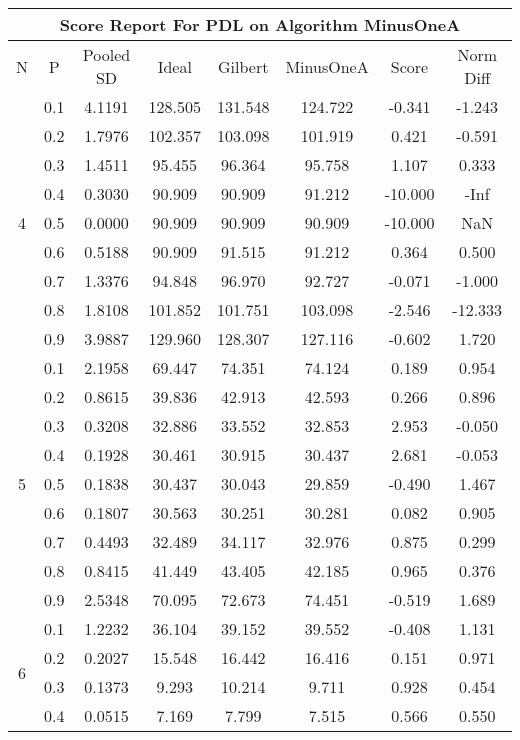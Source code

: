 \documentclass[11pt,a4paper]{report}
\begin{document}
\begin{longtable}{ | c | c || c | c | c | c | c | c | }
\hline
\multicolumn{8}{|c|}{ Score Report For PDL on Algorithm MinusOneA} \\
\hline
N & P & Pooled SD &  Ideal &  Gilbert & MinusOneA  & Score & Norm Diff \\
 \hline
 \hline
 \endhead
\multirow{9}{*}{4} & 0.1 & 4.1191 & 128.505 & 131.548 & 124.722 & -0.341 & -1.243 \\
 & 0.2 & 1.7976 & 102.357 & 103.098 & 101.919 & 0.421 & -0.591 \\
 & 0.3 & 1.4511 & 95.455 & 96.364 & 95.758 & 1.107 & 0.333 \\
 & 0.4 & 0.3030 & 90.909 & 90.909 & 91.212 & -10.000 & -Inf \\
 & 0.5 & 0.0000 & 90.909 & 90.909 & 90.909 & -10.000 & NaN \\
 & 0.6 & 0.5188 & 90.909 & 91.515 & 91.212 & 0.364 & 0.500 \\
 & 0.7 & 1.3376 & 94.848 & 96.970 & 92.727 & -0.071 & -1.000 \\
 & 0.8 & 1.8108 & 101.852 & 101.751 & 103.098 & -2.546 & -12.333 \\
 & 0.9 & 3.9887 & 129.960 & 128.307 & 127.116 & -0.602 & 1.720 \\
 \hline
\multirow{9}{*}{5} & 0.1 & 2.1958 & 69.447 & 74.351 & 74.124 & 0.189 & 0.954 \\
 & 0.2 & 0.8615 & 39.836 & 42.913 & 42.593 & 0.266 & 0.896 \\
 & 0.3 & 0.3208 & 32.886 & 33.552 & 32.853 & 2.953 & -0.050 \\
 & 0.4 & 0.1928 & 30.461 & 30.915 & 30.437 & 2.681 & -0.053 \\
 & 0.5 & 0.1838 & 30.437 & 30.043 & 29.859 & -0.490 & 1.467 \\
 & 0.6 & 0.1807 & 30.563 & 30.251 & 30.281 & 0.082 & 0.905 \\
 & 0.7 & 0.4493 & 32.489 & 34.117 & 32.976 & 0.875 & 0.299 \\
 & 0.8 & 0.8415 & 41.449 & 43.405 & 42.185 & 0.965 & 0.376 \\
 & 0.9 & 2.5348 & 70.095 & 72.673 & 74.451 & -0.519 & 1.689 \\
 \hline
\multirow{9}{*}{6} & 0.1 & 1.2232 & 36.104 & 39.152 & 39.552 & -0.408 & 1.131 \\
 & 0.2 & 0.2027 & 15.548 & 16.442 & 16.416 & 0.151 & 0.971 \\
 & 0.3 & 0.1373 & 9.293 & 10.214 & 9.711 & 0.928 & 0.454 \\
 & 0.4 & 0.0515 & 7.169 & 7.799 & 7.515 & 0.566 & 0.550 \\

\end{longtable}
\end{document}
